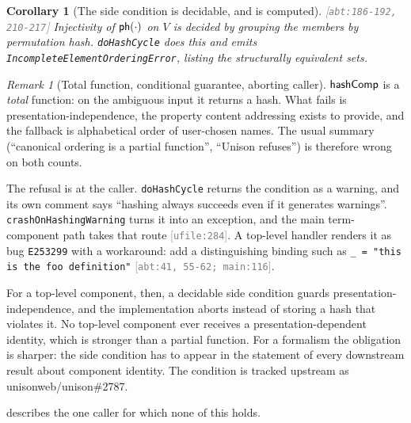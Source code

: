 \documentclass[11pt]{article}
\theoremstyle{definition}
\theoremstyle{plain}
\newtheorem{corollary}{Corollary}[section]
\theoremstyle{remark}
\newtheorem{remark}{Remark}[section]
\newcommand{\src}[1]{{\footnotesize\textcolor{gray}{[\texttt{#1}]}}}
\begin{document}
\begin{corollary}[The side condition is decidable, and is computed]\label{cor:detect}
\src{abt:186-192, 210-217} Injectivity of $\mathsf{ph}(\cdot)$ on $V$ is decided by grouping the
members by permutation hash. \texttt{doHashCycle} does this and emits
\texttt{IncompleteElementOrderingError}, listing the structurally equivalent sets.
\end{corollary}

\begin{remark}[Total function, conditional guarantee, aborting caller]\label{rem:notpartial}
$\mathsf{hashComp}$ is a \emph{total} function: on the ambiguous input it returns a hash. What fails is
presentation-independence, the property content addressing exists to provide, and the fallback is
alphabetical order of user-chosen names. The usual summary (``canonical ordering is a partial
function'', ``Unison refuses'') is therefore wrong on both counts.

The refusal is at the caller. \texttt{doHashCycle} returns the condition as a warning, and its own
comment says ``hashing always succeeds even if it generates warnings''. \texttt{crashOnHashingWarning}
turns it into an exception, and the main term-component path takes that route \src{ufile:284}. A
top-level handler renders it as bug \texttt{E253299} with a workaround: add a distinguishing binding
such as \texttt{\_ = "this is the foo definition"} \src{abt:41, 55-62; main:116}.

For a top-level component, then, a decidable side condition guards presentation-independence, and the
implementation aborts instead of storing a hash that violates it. No top-level component ever receives
a presentation-dependent identity, which is stronger than a partial function. For a formalism the
obligation is sharper: the side condition has to appear in the statement of every downstream result
about component identity. The condition is tracked upstream as unisonweb/unison\#2787.

 describes the one caller for which none of this holds.
\end{remark}
\end{document}
